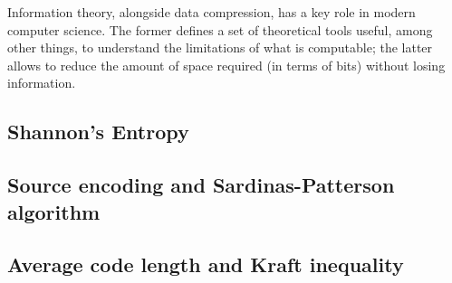 \documentclass{subfiles}
\begin{document}
    Information theory, alongside data compression,
        has a key role in modern computer science. 
        The former defines a set of theoretical tools useful, 
        among other things, to understand the limitations of what is computable;
        the latter allows to reduce the amount of space required (in terms of bits)
        without losing information.

    \subsection{Shannon's Entropy}\label{Sec:1.1}
    

    \subsection[Encoding of a source]{Source encoding and Sardinas-Patterson algorithm}
    

    \subsection{Average code length and Kraft inequality}
    
\end{document}
